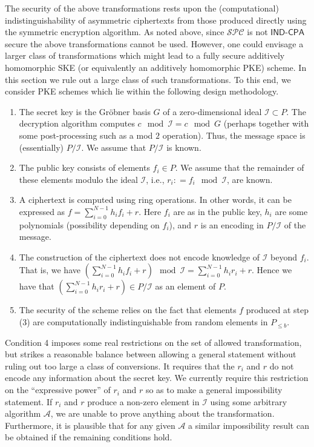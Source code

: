 \documentclass[draft]{llncs}
\newcommand{\I}{\ensuremath{\mathcal{I}}\xspace}
\newcommand{\SPC}{\ensuremath{\mathcal{SPC}}\xspace}
\newcommand{\A}{\ensuremath{\mathcal{A}}\xspace}
\newcommand{\IND}{\mathsf{IND}}
\newcommand{\CPA}{\mathsf{CPA}}
\begin{document}
The security of the above transformations rests upon the (computational) indistinguishability of asymmetric ciphertexts from those produced directly using the symmetric encryption algorithm. 
As noted above, since $\SPC$ is not $\IND\mbox{-}\CPA$ secure the above transformations cannot be used. However, one could envisage a larger class of transformations which might lead to a fully secure additively homomorphic SKE (or equivalently an additively homomorphic PKE) scheme. 
In this section we rule out a large class of such transformations. To this end, we consider PKE schemes which lie within the following design methodology.
\begin{enumerate}
\item The secret key is the Gröbner basis $G$ of a zero-dimensional ideal $\I \subset P$. The decryption algorithm computes $c \mod \I = c \mod G$ (perhaps together with some post-processing such as a mod $2$ operation). Thus, the message space is (essentially) $P/\I$. We assume that $P/\I$ is known.
\item The public key consists of elements $f_i \in P$. We assume that the remainder of these elements modulo the ideal $\I$, i.e., $r_i : = f_i \mod \I$, are known.
\item A ciphertext is computed using ring operations. In other words, it can be expressed as $f = \sum_{i=0}^{N-1} h_if_i + r.$
Here $f_i$ are as in the public key, $h_i$ are some polynomials (possibility depending on $f_i$), and $r$ is an encoding in $P/\I$ of the message. 
\item The construction of the ciphertext does not encode know\-ledge of $\I$ beyond $f_i$. That is, we have 
$\left( \sum_{i=0}^{N-1} h_if_i + r\right) \mod \I = \sum_{i=0}^{N-1} h_ir_i + r.$
Hence we have that $\left( \sum_{i=0}^{N-1} h_ir_i + r\right) \in P/\I$ as an element of $P$.
\item The security of the scheme relies on the fact that elements $f$ produced at step (3) are computationally indistinguishable from random elements in $P_{\le b}$. 
\end{enumerate}

Condition 4 imposes some real restrictions on the set of allowed transformation, but strikes a reasonable balance between allowing a general statement without ruling out too large a class of conversions. It requires that the $r_i$ and $r$ do not encode any information about the secret key. We currently require this restriction on the ``expressive power'' of $r_i$ and $r$ so as to make a general impossibility statement. If $r_i$ and $r$ produce a non-zero element in $\I$ using some arbitrary algorithm $\A$, we are unable to prove anything about the transformation. Furthermore, it is plausible that for any given $\A$ a similar impossibility result can be obtained if the remaining conditions hold.
\end{document}
